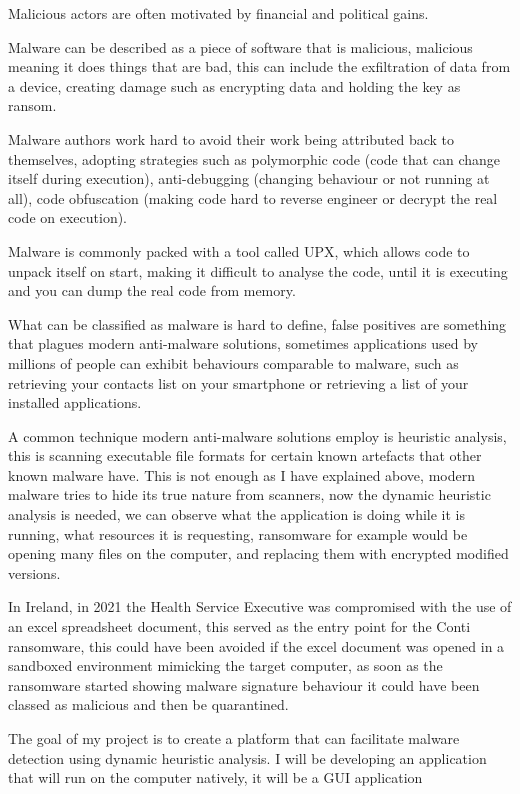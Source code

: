 



Malicious actors are often motivated by financial and political gains.

Malware can be described as a piece of software that is malicious,
malicious meaning it does things that are bad,
this can include the exfiltration of data from a device,
creating damage such as encrypting data and holding the key as ransom.

Malware authors work hard to avoid their work being attributed back to themselves,
adopting strategies such as polymorphic code (code that can change itself during execution),
anti-debugging (changing behaviour or not running at all),
code obfuscation (making code hard to reverse engineer or decrypt the real code on execution).

Malware is commonly packed with a tool called UPX, which allows code to unpack itself on start,
making it difficult to analyse the code, until it is executing and you can dump the real code from memory.

What can be classified as malware is hard to define, false positives are something that plagues modern anti-malware solutions,
sometimes applications used by millions of people can exhibit behaviours comparable to malware,
such as retrieving your contacts list on your smartphone or retrieving a list of your installed applications.

A common technique modern anti-malware solutions employ is heuristic analysis,
this is scanning executable file formats for certain known artefacts that other known malware have.
This is not enough as I have explained above, modern malware tries to hide its true nature from scanners,
now the dynamic heuristic analysis is needed, we can observe what the application is doing while it is running, what resources it is requesting,
ransomware for example would be opening many files on the computer, and replacing them with encrypted modified versions.

In Ireland, in 2021 the Health Service Executive was compromised with the use of an excel spreadsheet document,
this served as the entry point for the Conti ransomware, this could have been avoided if the excel document was opened in a sandboxed environment mimicking the target computer,
as soon as the ransomware started showing malware signature behaviour it could have been classed as malicious and then be quarantined.

The goal of my project is to create a platform that can facilitate malware detection using dynamic heuristic analysis.
I will be developing an application that will run on the computer natively, it will be a GUI application

